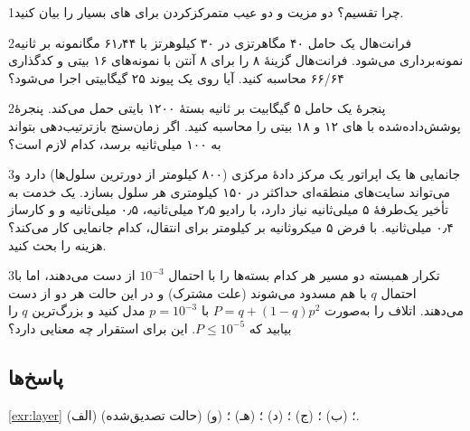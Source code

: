 \documentclass[11pt,a4paper]{article}
\begin{document}
\begin{exercisebox}{1}{چرا تقسیم؟}\label{exr:why}
دو مزیت و دو عیب متمرکزکردن  برای های بسیار را بیان کنید.
\end{exercisebox}

\begin{exercisebox}{2}{فرانت‌هال}\label{exr:fh}
یک حامل ۴۰ مگاهرتزی در ۳۰ کیلوهرتز با ۶۱٫۴۴ مگانمونه بر ثانیه نمونه‌برداری می‌شود. فرانت‌هال گزینهٔ ۸ را برای ۸ آنتن با نمونه‌های ۱۶ بیتی و
کدگذاری ۶۶/۶۴ محاسبه کنید. آیا روی یک پیوند ۲۵ گیگابیتی اجرا می‌شود؟
\end{exercisebox}

\begin{exercisebox}{2}{پنجرهٔ }\label{exr:sn}
یک حامل ۵ گیگابیت بر ثانیه بستهٔ ۱۲۰۰ بایتی حمل می‌کند. پنجرهٔ پوشش‌داده‌شده با های ۱۲ و ۱۸ بیتی  را محاسبه کنید. اگر زمان‌سنج
بازترتیب‌دهی بتواند به ۱۰۰ میلی‌ثانیه برسد، کدام لازم است؟
\end{exercisebox}

\begin{exercisebox}{3}{جانمایی ها}\label{exr:place}
یک اپراتور یک مرکز دادهٔ مرکزی (۸۰۰ کیلومتر از دورترین سلول‌ها) دارد و می‌تواند سایت‌های منطقه‌ای حداکثر در ۱۵۰ کیلومتری هر سلول بسازد. یک خدمت به
تأخیر یک‌طرفهٔ ۵ میلی‌ثانیه نیاز دارد، با رادیو ۲٫۵ میلی‌ثانیه،  ۰٫۵ میلی‌ثانیه و  و کارساز ۰٫۴ میلی‌ثانیه. با فرض ۵ میکروثانیه بر
کیلومتر برای انتقال، کدام جانمایی کار می‌کند؟ هزینه را بحث کنید.
\end{exercisebox}

\begin{exercisebox}{3}{تکرار همبسته}\label{exr:corr}
دو مسیر هر کدام بسته‌ها را با احتمال $10^{-3}$ از دست می‌دهند، اما با احتمال $q$ با هم مسدود می‌شوند (علت مشترک) و در این حالت هر دو از دست
می‌دهند. اتلاف را به‌صورت $P = q + (1-q)p^2$ با $p = 10^{-3}$ مدل کنید و بزرگ‌ترین $q$ را بیابید که $P \le 10^{-5}$. این برای استقرار چه معنایی دارد؟
\end{exercisebox}

\subsection*{پاسخ‌ها}

\begin{solutionbox}{\ref{exr:layer}}
(الف) ؛ (ب) ؛ (ج) ؛ (د) ؛ (هـ) ؛ (و)  (حالت تصدیق‌شده).
\end{solutionbox}
\end{document}
